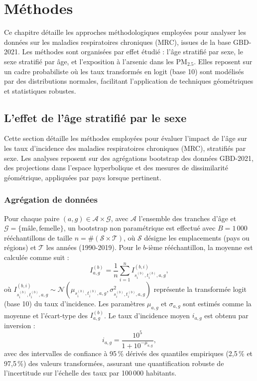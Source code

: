 \chapter{Méthodes}
\label{chap:methods}
Ce chapitre détaille les approches méthodologiques employées pour analyser les données sur les maladies respiratoires chroniques (MRC), issues de la base GBD-2021. Les méthodes sont organisées par effet étudié : l'âge stratifié par sexe, le sexe stratifié par âge, et l'exposition à l'arsenic dans les PM$_{2.5}$. Elles reposent sur un cadre probabiliste où les taux transformés en logit (base 10) sont modélisés par des distributions normales, facilitant l'application de techniques géométriques et statistiques robustes.

\section{L'effet de l'âge stratifié par le sexe}

Cette section détaille les méthodes employées pour évaluer l'impact de l'âge sur les taux d'incidence des maladies respiratoires chroniques (MRC), stratifiés par sexe. Les analyses reposent sur des agrégations bootstrap des données GBD-2021, des projections dans l'espace hyperbolique et des mesures de dissimilarité géométrique, appliquées par pays lorsque pertinent.

\subsection{Agrégation de données}

Pour chaque paire $(a, g) \in \mathcal{A} \times \mathcal{G}$, avec $\mathcal{A}$ l'ensemble des tranches d'âge et $\mathcal{G} = \{\text{mâle}, \text{femelle}\}$, un bootstrap non paramétrique est effectué avec $B = 1\,000$ rééchantillons de taille $n = \#(\mathcal{S} \times \mathcal{T})$, où $\mathcal{S}$ désigne les emplacements (pays ou régions) et $\mathcal{T}$ les années (1990-2019). Pour le $b$-ième rééchantillon, la moyenne est calculée comme suit :
 \begin{equation}
I_{a,g}^{(b)} = \frac{1}{n} \sum_{i=1}^n I_{s_i^{(b)}, t_i^{(b)}, a, g}^{(b,i)},
 \end{equation}
où $I_{s_i^{(b)}, t_i^{(b)}, a, g}^{(b,i)} \sim \mathcal{N}(\mu_{s_i^{(b)}, t_i^{(b)}, a, g}, \sigma_{s_i^{(b)}, t_i^{(b)}, a, g}^2)$ représente la transformée logit (base 10) du taux d'incidence. Les paramètres $\mu_{a,g}$ et $\sigma_{a,g}$ sont estimés comme la moyenne et l'écart-type des $I_{a,g}^{(b)}$. Le taux d'incidence moyen $i_{a,g}$ est obtenu par inversion :
 \begin{equation}
i_{a,g} = \frac{10^5}{1 + 10^{-\mu_{a,g}}},
 \end{equation}
avec des intervalles de confiance à 95\,\% dérivés des quantiles empiriques (2,5\,\% et 97,5\,\%) des valeurs transformées, assurant une quantification robuste de l'incertitude sur l'échelle des taux par 100\,000 habitants.

